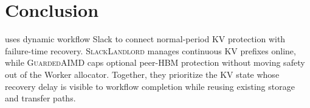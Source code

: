 \section{Conclusion}
\label{sec:conclusion}

\system{} uses dynamic workflow Slack to connect normal-period KV protection
with failure-time recovery.  \textsc{SlackLandlord} manages continuous KV
prefixes online, while \textsc{GuardedAIMD} caps optional peer-HBM protection
without moving safety out of the Worker allocator.  Together, they prioritize
the KV state whose recovery delay is visible to workflow completion while
reusing existing storage and transfer paths.
